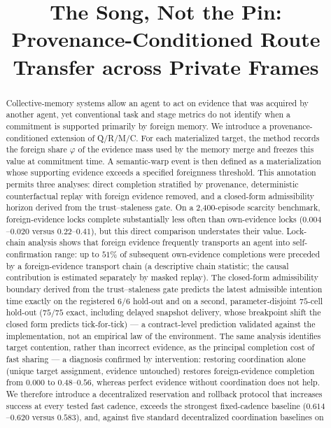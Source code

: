 \documentclass{article}
\title{The Song, Not the Pin: Provenance-Conditioned Route Transfer across Private Frames}
\begin{document}
\maketitle
\begin{abstract}
Collective-memory systems allow an agent to act on evidence that was
acquired by another agent, yet conventional task and stage metrics do
not identify when a commitment is supported primarily by foreign
memory. We introduce a provenance-conditioned extension of Q/R/M/C.
For each materialized target, the method records the foreign share
$\varphi$ of the evidence mass used by the memory merge and freezes
this value at commitment time. A semantic-warp event is then defined
as a materialization whose supporting evidence exceeds a specified
foreignness threshold. This annotation permits three analyses: direct
completion stratified by provenance, deterministic counterfactual
replay with foreign evidence removed, and a closed-form admissibility
horizon derived from the trust--staleness gate. On a 2,400-episode
scarcity benchmark, foreign-evidence locks complete substantially less
often than own-evidence locks ($0.004$--$0.020$ versus
$0.22$--$0.41$), but this direct comparison understates their value.
Lock-chain analysis shows that foreign evidence frequently transports
an agent into self-confirmation range: up to $51\%$ of subsequent
own-evidence completions were preceded by a foreign-evidence transport
chain (a descriptive chain statistic; the causal contribution is
estimated separately by masked replay). The closed-form admissibility
boundary derived from the trust--staleness gate predicts the latest
admissible intention time exactly on the registered $6/6$ hold-out and
on a second, parameter-disjoint $75$-cell hold-out ($75/75$ exact,
including delayed snapshot delivery, whose breakpoint shift the closed
form predicts tick-for-tick) --- a contract-level prediction validated
against the implementation, not an empirical law of the environment. The same analysis identifies target contention, rather
than incorrect evidence, as the principal completion cost of fast
sharing --- a diagnosis confirmed by intervention: restoring
coordination alone (unique target assignment, evidence untouched)
restores foreign-evidence completion from $0.000$ to $0.48$--$0.56$,
whereas perfect evidence without coordination does not help. We
therefore introduce a decentralized reservation and rollback protocol
that increases success at every tested fast cadence, exceeds the
strongest fixed-cadence baseline ($0.614$--$0.620$ versus $0.583$),
and, against five standard decentralized coordination baselines on

\end{abstract}
\end{document}
